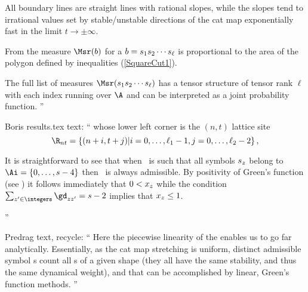 \begin{description}
All boundary lines are straight
lines with rational slopes, while the slopes tend to irrational values set by
stable/unstable directions of the cat map exponentially fast in the limit $t
\rightarrow \pm\infty$.

From  the measure $\Msr(b)$ for a {\brick} $b =
{s_{1}} {s_{2}} \cdots {\ensuremath{s_{\ell}}}$ is proportional to the area
of the polygon defined by inequalities (\ref{SquareCut1}).

The full list of measures $\Msr(\Ssym{1} \Ssym{2} \cdots \Ssym{\ell})$
has a tensor structure of tensor rank $\ell$ with each index running over
$\A$ and can be interpreted as a joint probability function.
''

Boris results.tex text: ``
whose lower left corner is the $(n,t)$ lattice site
\[
 \R_{nt} =\{(n+i, t+j) | i= 0, \dots, \ell_1-1, j= 0,\dots, \ell_2-2 \}
\,,
\]

It is straightforward to see that when \Mm\ is such that all symbols ${s_{z}}$
belong to $\Ai=\{0,\dots,s-4\}$ then    \Mm\ is always admissible. By
positivity of  Green's function (see ) it follows
immediately that  $0 <x_{z}$  while the condition
$\sum_{z'\in\integers}\gd_{zz'}=s-2$ implies that $x_z\leq 1$.

''

Predrag text, recycle: ``
Here the piecewise linearity of the {\catlatt} enables us to go far analytically.
Essentially, as the cat map stretching is uniform, distinct admissible symbol
\brick s count all \brick s of a given shape (they all have the same
stability, and thus the same dynamical weight), and that can be accomplished
by linear, Green's function methods.
''


\end{description}
